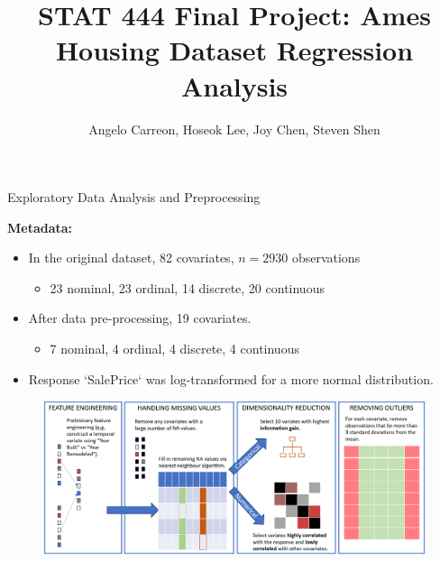 \documentclass[10pt,usenames,dvipsnames,t,leqno]{beamer}
\title{STAT 444 Final Project: Ames Housing Dataset Regression Analysis}
\author{Angelo Carreon, Hoseok Lee, Joy Chen, Steven Shen}
\date{} %
\begin{document}
\begin{frame}
\titlepage

\end{frame}

\begin{frame}{Exploratory Data Analysis and Preprocessing}
 
\textbf{Metadata:}
 
\begin{itemize}
\item In the original dataset, 82 covariates, $n=2930$ observations
\begin{itemize}
    \item 23 nominal, 23 ordinal, 14 discrete, 20 continuous
\end{itemize}
\item After data pre-processing, 19 covariates. 
    \begin{itemize}
    \item 7 nominal, 4 ordinal, 4 discrete, 4 continuous
    \end{itemize}
\item Response `SalePrice` was log-transformed for a more normal distribution.

\end{itemize}
 
\begin{figure}
    \centering
    \includegraphics[width=0.9\linewidth]{EDA_PREPROCESSING.png}
\end{figure}
 
\end{frame}
\end{document}
